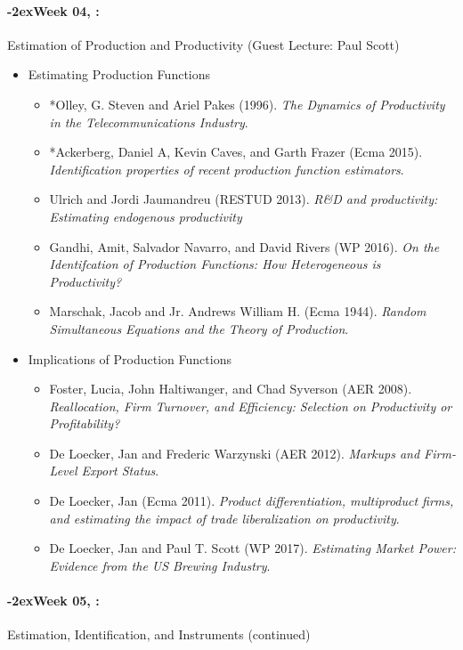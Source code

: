 \documentclass[11pt]{article}
\newcommand{\week}[1]{%
  \paragraph*{\kern-2ex\quad #1, \syldate{\today}:}%
  \ifdim\wd1=\wd\THURSDAY
    \AdvanceDate[7]
  \else
    \AdvanceDate[7]
  \fi%
}
\begin{document}
\week{Week 04} Estimation of Production and Productivity (Guest Lecture: Paul Scott)
\begin{itemize}
\item Estimating Production Functions
\begin{itemize}
\item *Olley, G. Steven and Ariel Pakes (1996). \textit{The Dynamics of Productivity in the Telecommunications Industry}.
\item  *Ackerberg, Daniel A, Kevin Caves, and Garth Frazer (Ecma 2015). \textit{Identification properties of recent production function estimators}.
\item Ulrich and Jordi Jaumandreu (RESTUD 2013). \textit{R\&D and productivity: Estimating endogenous productivity}
\item Gandhi, Amit, Salvador Navarro, and David Rivers (WP 2016). \textit{On the Identifcation of Production Functions: How Heterogeneous is Productivity?}
\item Marschak, Jacob and Jr. Andrews William H. (Ecma 1944). \textit{Random Simultaneous Equations and the Theory of Production}.
\end{itemize}
\item Implications of Production Functions
\begin{itemize}
\item Foster, Lucia, John Haltiwanger, and Chad Syverson (AER 2008). \textit{Reallocation, Firm Turnover, and Efficiency: Selection on Productivity or Profitability?}
\item De Loecker, Jan and Frederic Warzynski (AER 2012). \textit{Markups and Firm-Level Export Status}.
\item De Loecker, Jan (Ecma 2011). \textit{Product differentiation, multiproduct firms, and estimating the impact of trade liberalization on productivity}.
\item De Loecker, Jan and Paul T. Scott (WP 2017). \textit{Estimating Market Power: Evidence from the US Brewing Industry}.
\end{itemize}
\end{itemize}

\week{Week 05} Estimation, Identification, and Instruments (continued) 
\end{document}
